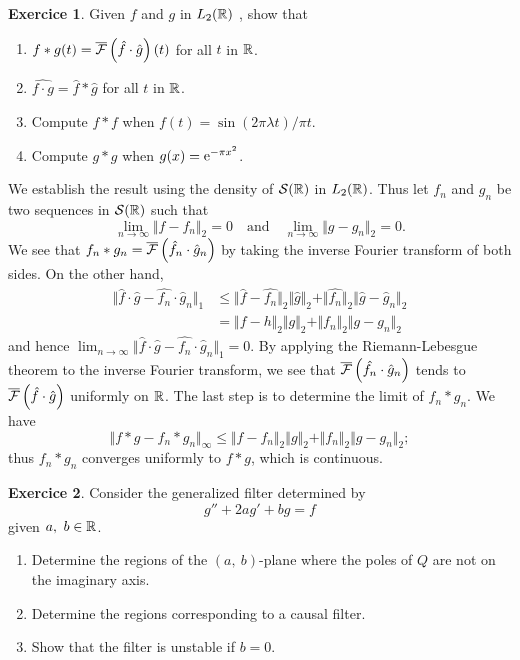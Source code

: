 \documentclass[a4paper,11pt,fleqn]{article}
\theoremstyle{definition}
\newtheorem{exercice}{Exercice}
\begin{document}
\begin{exercice}
Given $f$ and $g$ in $L_2(\mathbb{R})$ , show that
\begin{enumerate}[label=(\roman*)]
\item $f*g(t)=\overline{\mathcal{F}}\left( \hat{f}\cdot\hat{g} \right)(t)$  for all $t$ in $\mathbb{R}$.
\item $\widehat{f\cdot g}=\hat{f}*\hat{g}$ for all $t$  in $\mathbb{R}$.
\item Compute $f * f$ when $f(t)= \sin(2 \pi \lambda t)/ \pi t$.
\item Compute $g * g$ when $g(x)= \mathrm{e}^{-\pi x^2}$.
\end{enumerate}
\end{exercice}


We establish the result using the density of $\mathcal{S}(\mathbb{R})$ in $L_2(\mathbb{R})$. Thus let $f_{n}$ and $g_{n}$ be two sequences in $\mathcal{S}(\mathbb{R})$ such that
$$
\lim_{n\rightarrow\infty}\Vert f-f_{n}\Vert_{2}=0 \quad \text{and} \quad \lim_{n\rightarrow\infty}\Vert g -g_{n}\Vert_{2}=0 .
$$
We see that $f_{n}*g_{n}=\overline{\mathcal{F}}\left( \hat{f}_{n}\cdot\hat{g}_{n} \right)$ by taking the inverse Fourier transform of both sides. On the other hand,
\begin{align*}
\Vert\hat{f}\cdot\hat{g}-\hat{f_{n}}\cdot\hat{g}_{n}\Vert_{1}
&\leq\Vert\hat{f}-\hat{f_{n}}\Vert_{2}\Vert\hat{g}\Vert_{2}+\Vert\hat{f_{n}}\Vert_{2}\Vert\hat{g}-\hat{g}_{n}\Vert_{2} \\
&=\Vert f-h\Vert_{2}\Vert g\Vert_{2}+\Vert f_{n}\Vert_{2}\Vert g-g_{n}\Vert_{2}
\end{align*}
and hence $\lim_{n\rightarrow\infty}\Vert\hat{f}\cdot\hat{g}-\hat{f_{n}}\cdot\hat{g}_{n}\Vert_{1}=0$. By applying the Riemann-Lebesgue theorem to the inverse Fourier transform, we see that $\overline{\mathcal{F}}\left( \hat{f_{n}}\cdot\hat{g}_{n} \right)$ tends to $\overline{\mathcal{F}}\left( \hat{f}\cdot\hat{g} \right)$ uniformly on $\mathbb{R}$. The last step is to determine the limit of $f_{n}*g_{n}$. We have
$$
\Vert f*g-f_{n}*g_{n}\Vert_{\infty}\leq\Vert f-f_{n}\Vert_{2}\Vert g\Vert_{2}+\Vert f_{n}\Vert_{2}\Vert g-g_{n}\Vert_{2};
$$
thus $f_{n}*g_{n}$ converges uniformly to $f*g$, which is continuous.

\begin{exercice}
Consider the generalized filter determined by
$$
g''+2ag'+bg=f
$$
given $a,\ b\in \mathbb{R}$.
\begin{enumerate}[label=(\alph*)]
\item Determine the regions of the $(a,\ b)$-plane where the poles of $Q$ are not on the imaginary axis.
\item Determine the regions corresponding to a causal filter.
\item Show that the filter is unstable if $b=0$.
\end{enumerate}
\end{exercice}
\end{document}
